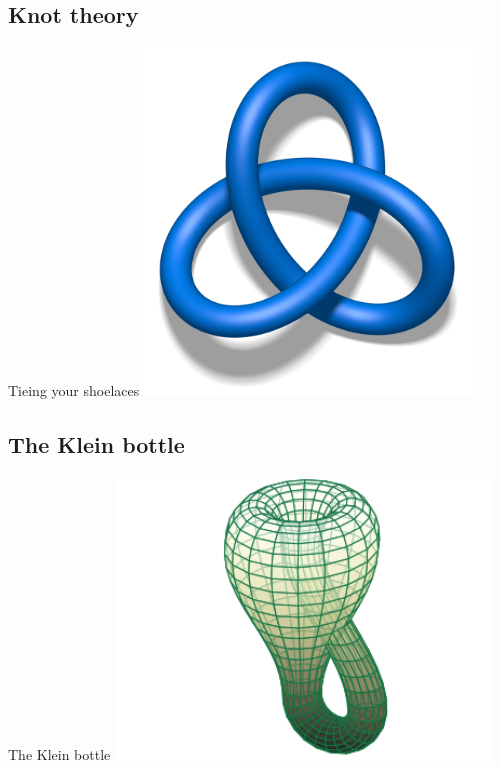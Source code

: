 \documentclass[12pt,compress,ngerman,utf8,t]{beamer}
\renewcommand{\_}{\mathpunct{.}\,}
\begin{document}
\subsection{Knot theory}

\begin{frame}{Tieing your shoelaces}
  \centering
  \includegraphics[width=0.65\textwidth]{trefoil-knot}
  \par
\end{frame}


%
%

\subsection{The Klein bottle}

\begin{frame}{The Klein bottle}
  \centering
  \includegraphics[width=0.75\textwidth]{klein-bottle}
  \par
\end{frame}
\end{document}
